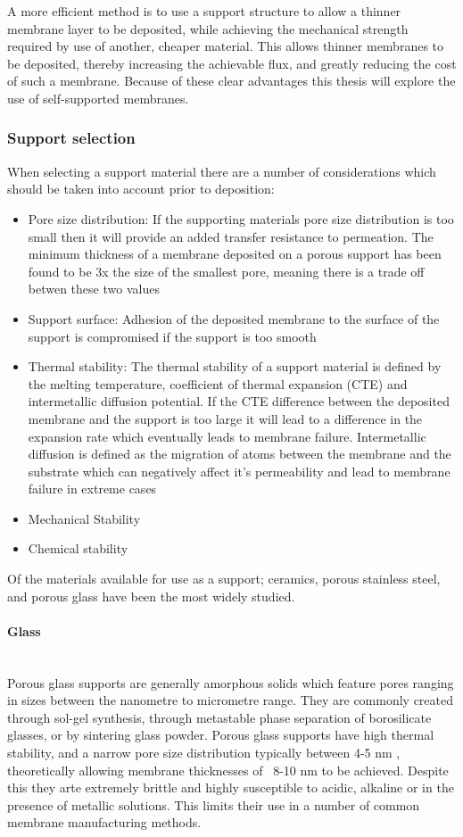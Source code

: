 A more efficient method is to use a support structure to allow a thinner membrane layer to 
be deposited, while achieving the mechanical strength required by use of another, cheaper 
material. This allows thinner membranes to be deposited, thereby increasing the achievable 
flux, and greatly reducing the cost of such a membrane.\cite{NathanW.Ockwig2007a} Because of these clear advantages 
this thesis will explore the use of self-supported membranes. 

\subsubsection{Support selection}
When selecting a support material there are a number of considerations which should be taken 
into account prior to deposition:
\begin{itemize}
\item Pore size distribution: If the supporting materials pore size distribution is too small then it will 
provide an added transfer resistance to permeation. The minimum thickness of a membrane deposited on a porous support has been found to be 3x the size of the smallest pore, \cite{Mardilovich2002} meaning there is a trade off betwen these two values
\item Support surface: Adhesion of the deposited membrane to the surface of the support is 
compromised if the support is too smooth
\item Thermal stability: The thermal stability of a support material is defined by the 
melting temperature, coefficient of thermal expansion (CTE) and intermetallic diffusion 
potential. If the CTE difference between the deposited membrane and the support is too large 
it will lead to a difference in the expansion rate which eventually leads to membrane failure. Intermetallic diffusion is defined as the migration of atoms between the membrane and the substrate which can negatively affect it’s permeability and lead to membrane failure in extreme cases
\item Mechanical Stability
\item Chemical stability
\end{itemize}
Of the materials available for use as a support; ceramics, porous stainless steel, and porous glass have been the most widely studied. 

\paragraph*{Glass}\\
Porous glass supports are generally amorphous solids which feature pores ranging in sizes between the nanometre to micrometre range. They are commonly created through sol-gel synthesis, through metastable phase separation of borosilicate glasses, or by sintering glass powder. Porous glass supports have high thermal stability, and a narrow pore size distribution typically between 4-5 nm \cite{SCHLUNDER2006113} \cite{UEMIYA1991303}, theoretically allowing membrane thicknesses of ~8-10 nm to be achieved. \cite{Mardilovich2002} Despite this they arte extremely brittle and highly susceptible to acidic, alkaline or in the presence of metallic solutions. This limits their use in a number of common membrane manufacturing methods. 

